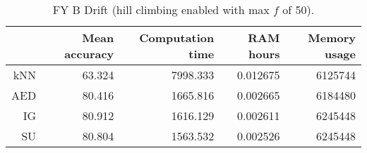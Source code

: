 \begin{table}[h]
\centering
\begin{tabular}{r|rrrr}
    & Mean accuracy & Computation time & RAM hours & Memory usage \\ \hline
kNN & 63.324                   & 7998.333         & 0.012675  & 6125744      \\
AED & 80.416                   & 1665.816         & 0.002665  & 6184480      \\
IG  & 80.912                   & 1616.129         & 0.002611  & 6245448      \\
SU  & 80.804                   & 1563.532         & 0.002526  & 6245448     
\end{tabular}
\caption{FY B Drift (hill climbing enabled with max $f$ of 50).}
\label{Table:FY_B_Drift_H}
\end{table}